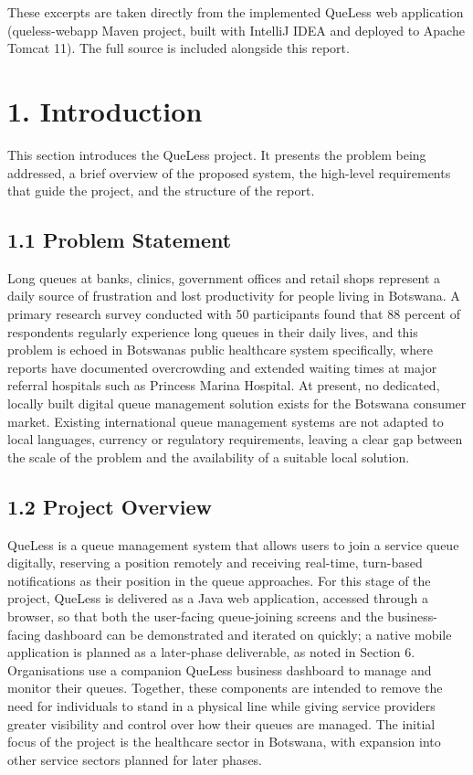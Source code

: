 \documentclass[
]{article}
\begin{document}
These excerpts are taken directly from the implemented QueLess web
application (queless-webapp Maven project, built with IntelliJ IDEA and
deployed to Apache Tomcat 11). The full source is included alongside
this report.

\section{1. Introduction}\label{introduction}

This section introduces the QueLess project. It presents the problem
being addressed, a brief overview of the proposed system, the high-level
requirements that guide the project, and the structure of the report.

\subsection{1.1 Problem Statement}\label{problem-statement}

Long queues at banks, clinics, government offices and retail shops
represent a daily source of frustration and lost productivity for people
living in Botswana. A primary research survey conducted with 50
participants found that 88 percent of respondents regularly experience
long queues in their daily lives, and this problem is echoed in
Botswana\textquotesingle s public healthcare system specifically, where
reports have documented overcrowding and extended waiting times at major
referral hospitals such as Princess Marina Hospital. At present, no
dedicated, locally built digital queue management solution exists for
the Botswana consumer market. Existing international queue management
systems are not adapted to local languages, currency or regulatory
requirements, leaving a clear gap between the scale of the problem and
the availability of a suitable local solution.

\subsection{1.2 Project Overview}\label{project-overview}

QueLess is a queue management system that allows users to join a service
queue digitally, reserving a position remotely and receiving real-time,
turn-based notifications as their position in the queue approaches. For
this stage of the project, QueLess is delivered as a Java web
application, accessed through a browser, so that both the user-facing
queue-joining screens and the business-facing dashboard can be
demonstrated and iterated on quickly; a native mobile application is
planned as a later-phase deliverable, as noted in Section 6.
Organisations use a companion QueLess business dashboard to manage and
monitor their queues. Together, these components are intended to remove
the need for individuals to stand in a physical line while giving
service providers greater visibility and control over how their queues
are managed. The initial focus of the project is the healthcare sector
in Botswana, with expansion into other service sectors planned for later
phases.
\end{document}
